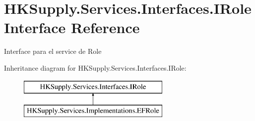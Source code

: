 \hypertarget{interface_h_k_supply_1_1_services_1_1_interfaces_1_1_i_role}{}\section{H\+K\+Supply.\+Services.\+Interfaces.\+I\+Role Interface Reference}
\label{interface_h_k_supply_1_1_services_1_1_interfaces_1_1_i_role}


Interface para el service de Role  


Inheritance diagram for H\+K\+Supply.\+Services.\+Interfaces.\+I\+Role\+:\begin{figure}[H]
\begin{center}
\leavevmode
\includegraphics[height=2.000000cm]{interface_h_k_supply_1_1_services_1_1_interfaces_1_1_i_role}
\end{center}
\end{figure}
